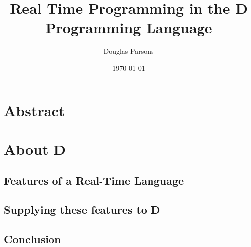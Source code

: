 \documentclass[a4paper, 11pt]{report}
\title{Real Time Programming in the 
            D Programming Language}
\author{Douglas Parsons}
\date{\today}
\begin{document}
\maketitle
%
\chapter*{Abstract}
\tableofcontents

\chapter{About D}

\section{Features of a Real-Time Language}

\section{Supplying these features to D}

\section{Conclusion}



%
\end{document}
